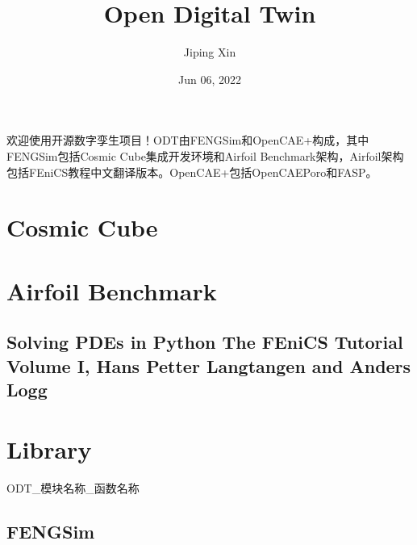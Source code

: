 \documentclass[letterpaper,10pt,english]{sphinxmanual}
\title{Open Digital Twin}
\date{Jun 06, 2022}
\author{Jiping Xin}
\let\sphinxpxdimen\pdfpxdimen\else\newdimen\sphinxpxdimen
\begin{document}
\pagestyle{empty}
\sphinxmaketitle
\pagestyle{plain}
\sphinxtableofcontents
\pagestyle{normal}
\label{\detokenize{index::doc}}
\sphinxAtStartPar
欢迎使用开源数字孪生项目！ODT由FENGSim和OpenCAE+构成，其中FENGSim包括Cosmic Cube集成开发环境和Airfoil Benchmark架构，Airfoil架构包括FEniCS教程中文翻译版本。OpenCAE+包括OpenCAEPoro和FASP。




\chapter{Cosmic Cube}
\label{\detokenize{index:cosmic-cube}}
\begin{sphinxVerbatim}[commandchars=\\\{\}]
  
\end{sphinxVerbatim}

\noindent\sphinxincludegraphics[width=400\sphinxpxdimen]{{cosmiccube}.jpg}


\chapter{Airfoil Benchmark}
\label{\detokenize{index:airfoil-benchmark}}

\section{Solving PDEs in Python \textendash{} The FEniCS Tutorial Volume I, Hans Petter Langtangen and Anders Logg}
\label{\detokenize{index:solving-pdes-in-python-the-fenics-tutorial-volume-i-hans-petter-langtangen-and-anders-logg}}

\chapter{Library}
\label{\detokenize{index:library}}
\sphinxAtStartPar
ODT\_模块名称\_函数名称

\sphinxstepscope


\section{FENGSim}
\label{\detokenize{api/library_root:fengsim}}\label{\detokenize{api/library_root::doc}}
\end{document}
